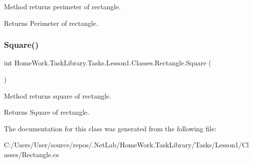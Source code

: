 Method returns perimeter of rectangle. 

\begin{DoxyReturn}{Returns}
Perimeter of rectangle.
\end{DoxyReturn}
\mbox{\label{class_home_work_1_1_task_library_1_1_tasks_1_1_lesson1_1_1_classes_1_1_rectangle_aae21928ea4ee074dd66821ad1be775ef}} 
\subsubsection{\texorpdfstring{Square()}{Square()}}
{\footnotesize\ttfamily int Home\+Work.\+Task\+Library.\+Tasks.\+Lesson1.\+Classes.\+Rectangle.\+Square (\begin{DoxyParamCaption}{ }\end{DoxyParamCaption})}



Method returns square of rectangle. 

\begin{DoxyReturn}{Returns}
Square of rectangle.
\end{DoxyReturn}


The documentation for this class was generated from the following file\+:\begin{DoxyCompactItemize}
\item 
C\+:/\+Users/\+User/source/repos/.\+Net\+Lab/\+Home\+Work.\+Task\+Library/\+Tasks/\+Lesson1/\+Classes/Rectangle.\+cs\end{DoxyCompactItemize}
